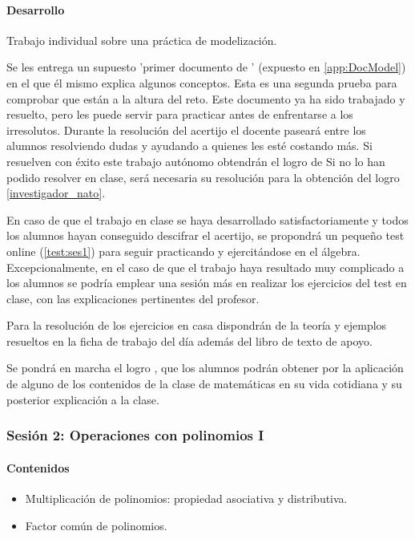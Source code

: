 \paragraph{Desarrollo} Trabajo individual sobre una práctica de modelización.


Se les entrega un supuesto 'primer documento de \arab' (expuesto en \ref{app:DocModel}) en el que él mismo explica algunos conceptos.
%
Esta es una segunda prueba para comprobar que están a la altura del reto.
%
Este documento ya ha sido trabajado y resuelto, pero les puede servir para practicar antes de enfrentarse a los irresolutos.
%
Durante la resolución del acertijo el docente paseará entre los alumnos resolviendo dudas y ayudando a quienes les esté costando más. 
%
Si resuelven con éxito este trabajo autónomo obtendrán el logro de 
%
Si no lo han podido resolver en clase, será necesaria su resolución para la obtención del logro \ref{investigador_nato}.

En caso de que el trabajo en clase se haya desarrollado satisfactoriamente y todos los alumnos hayan conseguido descifrar el acertijo, se propondrá un pequeño test online (\ref{test:ses1}) para seguir practicando y ejercitándose en el álgebra.
%
Excepcionalmente, en el caso de que el trabajo haya resultado muy complicado a los alumnos se podría emplear una sesión más en realizar los ejercicios del test en clase, con las explicaciones pertinentes del profesor.

Para la resolución de los ejercicios en casa dispondrán de la teoría y ejemplos resueltos en la ficha de trabajo del día además del libro de texto de apoyo.

Se pondrá en marcha el logro , que los alumnos podrán obtener por la aplicación de alguno de los contenidos de la clase de matemáticas en su vida cotidiana y su posterior explicación a la clase.


\subsubsection{Sesión 2: Operaciones con polinomios I}

\paragraph{Contenidos}
\begin{itemize}
	\item Multiplicación de polinomios: propiedad asociativa y distributiva.
	\item Factor común de polinomios.
\end{itemize}

